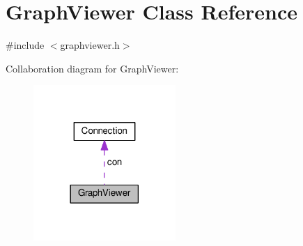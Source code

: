 \hypertarget{classGraphViewer}{}\section{Graph\+Viewer Class Reference}
\label{classGraphViewer}


{\ttfamily \#include $<$graphviewer.\+h$>$}



Collaboration diagram for Graph\+Viewer\+:\nopagebreak
\begin{figure}[H]
\begin{center}
\leavevmode
\includegraphics[width=153pt]{classGraphViewer__coll__graph}
\end{center}
\end{figure}
